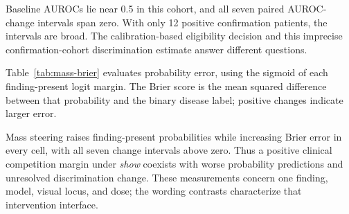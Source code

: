 Baseline AUROCs lie near 0.5 in this cohort, and all seven paired
AUROC-change intervals span zero. With only 12 positive confirmation
patients, the intervals are broad. The calibration-based eligibility
decision and this imprecise confirmation-cohort discrimination estimate
answer different questions.

Table~\ref{tab:mass-brier} evaluates probability error, using the sigmoid
of each finding-present logit margin. The Brier score is the mean squared
difference between that probability and the binary disease label;
positive changes indicate larger error.

\begin{table}[H]
\centering
\caption{Mass steering and probability error.}
\label{tab:mass-brier}
\end{table}

Mass steering raises finding-present probabilities while increasing Brier
error in every cell, with all seven change intervals above zero.
Thus a positive clinical competition margin under \textit{show} coexists
with worse probability predictions and unresolved discrimination change.
These measurements concern one finding, model, visual locus, and dose;
the wording contrasts characterize that intervention interface.

\FloatBarrier
